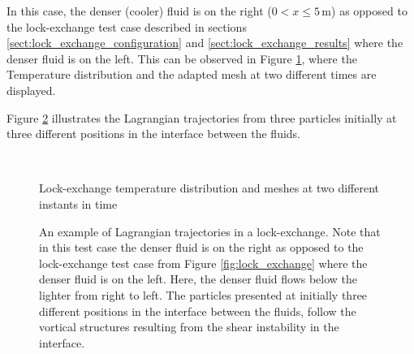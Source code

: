 In this case, the denser (cooler) fluid is on the right ($0<x \leq 5\,$m) as opposed to the lock-exchange test case described in sections \ref{sect:lock_exchange_configuration} and \ref{sect:lock_exchange_results}  where the denser fluid is on the left. This can be observed in Figure \ref{fig:lock_exchange_Lag_traject_Temp_mesh}, where the Temperature distribution and the adapted mesh at two different times are displayed.


Figure \ref{fig:lock_exchange_Lagrangian_trajectories} illustrates the Lagrangian trajectories from three particles initially at three different positions in the interface between the fluids.

\begin{figure}[ht]
  \centering
\begin{minipage}{1\linewidth}
\end{minipage}\\
\begin{minipage}{1\linewidth}
\vspace{0.5cm}
\end{minipage}
  \caption{Lock-exchange temperature distribution and meshes at two different instants in time}
  \label{fig:lock_exchange_Lag_traject_Temp_mesh}
\end{figure}


\begin{figure}[ht]
  \centering
\vspace*{-2.6cm}
\vspace{-2.8cm}
  \caption{An example of Lagrangian trajectories in a lock-exchange. Note that in this test case the denser fluid is on the right as opposed to the lock-exchange test case from Figure \ref{fig:lock_exchange} where the denser fluid is on the left. Here, the denser fluid flows below the lighter from right to left. The particles presented at initially three different positions in the interface between the fluids, follow the vortical structures resulting from the shear instability in the interface.}
  \label{fig:lock_exchange_Lagrangian_trajectories}
\end{figure}

